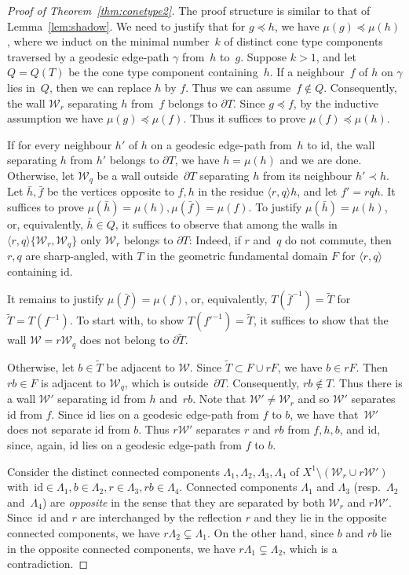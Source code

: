 \documentclass[Unicode,ALCO]{cedram}
\newcommand{\id}{\mathrm{id}}
\newcommand{\W}{\mathcal{W}}
\begin{document}
\begin{proof}[Proof of Theorem~\ref{thm:conetype2}]
	The proof structure is similar to that of Lemma~\ref{lem:shadow}. We need to justify that for $g\preceq h$, we have $\mu(g)\preceq \mu(h)$, where we induct on the minimal number~$k$ of distinct cone type components traversed by a geodesic edge-path $\gamma$ from~$h$ to~$g$. 
	Suppose $k>1$, and let $Q=Q(T)$ be the cone type component containing~$h$. 
	If a neighbour~$f$ of $h$ on $\gamma$ lies in~$Q$, then we can replace $h$ by $f$. Thus we can assume~$f\notin Q$. Consequently, the wall $\W_r$ separating $h$ from~$f$ belongs to $\partial T$. Since $g\preceq f$, by the inductive assumption we have $\mu(g)\preceq \mu(f)$. Thus it suffices to prove $\mu(f)\preceq \mu(h)$.
	
	If for every neighbour $h'$ of $h$ on a geodesic edge-path from~$h$ to $\id$, the wall separating $h$ from $h'$ belongs to $\partial T$, we have $h=\mu(h)$ and we are done. Otherwise, let $\W_q$ be a wall outside~$\partial T$ separating $h$ from its neighbour $h'\prec h$. Let $\bar h, \bar f$ be the vertices opposite to $f,h$ in the residue $\langle r,q\rangle h$, and let $f'=rqh$. It suffices to prove  $\mu(\bar h)=\mu(h), \mu(\bar f)=\mu(f)$. To justify $\mu(\bar h)=\mu(h)$, or, equivalently, $\bar h\in Q$, it suffices to observe that among the walls in $\langle r,q\rangle\{\W_r,\W_q\}$ only $\W_r$ belongs to $\partial T$: Indeed, if $r$ and~$q$ do not commute, then $r,q$ are sharp-angled, with $T$ in the geometric fundamental domain $F$ for $\langle r,q\rangle$ containing $\id$. 
	
	It remains to justify $\mu(\bar f)=\mu(f)$, or, equivalently, $T(\bar f^{-1})=\widetilde T$ for $\widetilde T=T(f^{-1})$. To start with, to show $T(f'^{-1})=\widetilde T$, it suffices to show that the wall $\W=r\W_q$ does not belong to $\partial \widetilde T$. 
	
	Otherwise, let $b\in \widetilde T$ be adjacent to $\W$. Since $\widetilde T\subset F\cup rF$, we have $b\in rF$. Then~$rb\in F$ is adjacent to $\W_q$, which is outside~$\partial T$. Consequently, $rb\notin T$. Thus there is a wall $\W'$ separating $\id$ from $h$ and~$rb$. Note that $\W'\neq \W_r$ and so $\W'$ separates $\id$ from $f$.
	Since $\id$ lies on a geodesic edge-path from $f$ to $b$, we have that~$\W'$ does not separate $\id$ from $b$. 
	Thus $r\W'$ separates $r$ and $rb$ from $f,h,b$, and $\id$, since, again, $\id$ lies on a geodesic edge-path from $f$ to $b$.
	
	Consider the distinct connected components $\Lambda_1,\Lambda_2,\Lambda_3,\Lambda_4$ of $X^1\setminus (\W_r\cup r\W')$ with~$\id\in \Lambda_1,b\in \Lambda_2,r\in \Lambda_3,rb\in \Lambda_4$. Connected components $\Lambda_1$ and $\Lambda_3$ (resp.\ $\Lambda_2$ and~$\Lambda_4$) are \emph{opposite} in the sense that they are separated by both $\W_r$ and $r\W'$.
	Since~$\id$ and $r$ are interchanged by the reflection $r$ and they lie in the opposite connected components, we have $r\Lambda_2\subsetneq \Lambda_1$. On the other hand, since $b$ and $rb$ lie in the opposite connected components, we have $r\Lambda_1\subsetneq \Lambda_2$, which is a contradiction. 
	

\end{proof}
\end{document}
